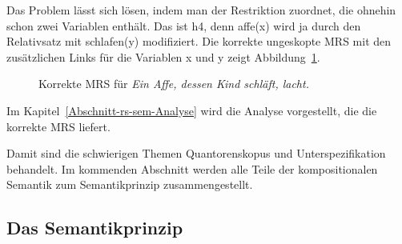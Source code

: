 %

Das Problem lässt sich lösen, indem man  der Restriktion zuordnet, die ohnehin schon zwei
Variablen enthält. Das ist h4, denn affe(x) wird ja durch den Relativsatz mit schlafen(y)
modifiziert. Die korrekte ungeskopte MRS mit den zusätzlichen Links für die Variablen x und y zeigt Abbildung~\ref{Abbildung dessen Kind}.
\begin{figure}
\caption{Korrekte MRS für \emph{Ein Affe, dessen Kind schläft, lacht.}}\label{Abbildung dessen Kind}
\end{figure}
Im Kapitel~\ref{Abschnitt-rs-sem-Analyse} wird die Analyse vorgestellt, die die korrekte MRS liefert. 

Damit sind die schwierigen Themen Quantorenskopus und Unterspezifikation behandelt. Im kommenden
Abschnitt werden alle Teile der kompositionalen Semantik zum Semantikprinzip zusammengestellt.

\subsection{Das Semantikprinzip}
\label{Abschnitt-Semantikprinzip}

